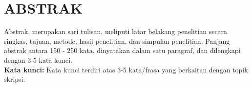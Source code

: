 \chapter*{\centering ABSTRAK}

\begin{spacing}{1.25}
\noindent Abstrak, merupakan sari tulisan, meliputi latar belakang penelitian secara ringkas, tujuan, metode, hasil penelitian, dan simpulan penelitian. Panjang abstrak antara 150 - 250 kata, dinyatakan dalam satu paragraf, dan dilengkapi dengan 3-5 kata kunci.\\

\noindent\textbf{Kata kunci:} Kata kunci terdiri atas 3-5 kata/frasa yang berkaitan dengan topik skripsi.
\end{spacing}